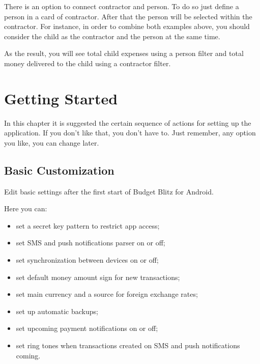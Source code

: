 \documentclass[a4paper,10pt,english]{sphinxmanual}
\begin{document}
There is an option to connect contractor and person. To do so just define a person in a card
of contractor. After that the person will be selected within the contractor. For instance, in order
to combine both examples above, you should consider the child as the contractor and the person at the same time.

As the result, you will see total child expenses using a person filter and total
money delivered to the child using a contractor filter.


\chapter{Getting Started}
\label{\detokenize{getting-started:getting-started}}\label{\detokenize{getting-started::doc}}
In this chapter it is suggested the certain sequence of actions for setting up the application.
If you don’t like that, you don’t have to.  Just remember, any option you like, you can change later.


\section{Basic Customization}
\label{\detokenize{getting-started:basic-customization}}
Edit basic settings after the first start of Budget Blitz for Android.

\noindent{}

\noindent{}

\noindent{}

Here you can:
\begin{itemize}
\item {} 
set a secret key pattern to restrict app access;

\item {} 
set SMS and push notifications parser on or off;

\item {} 
set synchronization between devices on or off;

\item {} 
set default money amount sign for new transactions;

\item {} 
set main currency and a source for foreign exchange rates;

\item {} 
set up automatic backups;

\item {} 
set upcoming payment notifications on or off;

\item {} 
set ring tones when transactions created on SMS and push notifications coming.

\end{itemize}
\end{document}
